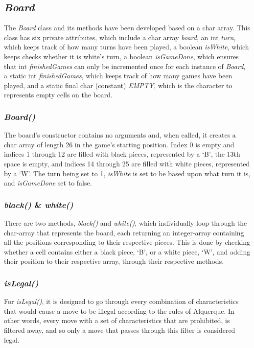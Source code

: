 \documentclass[12pt, a4paper]{article}
\begin{document}
\subsection{\emph{Board}}
The \emph{Board} class and its methods have been developed based on a char array. This class has six private attributes, which include a char array \emph{board}, an int \emph{turn}, which keeps track of how many turns have been played, a boolean \emph{isWhite}, which keeps checks whether it is white’s turn, a boolean \emph{isGameDone}, which ensures that int \emph{finishedGames} can only be incremented once for each instance of \emph{Board}, a static int \emph{finishedGames}, which keeps track of how many games have been played, and a static final char (constant) \emph{EMPTY}, which is the character to represents empty cells on the board.

\subsubsection{\emph{Board()}}
The board's constructor contains no arguments and, when called, it creates a char array of length 26 in the game's starting position. Index 0 is empty and indices 1 through 12 are filled with black pieces, represented by a ‘B’, the 13th space is empty, and indices 14 through 25 are filled with white pieces, represented by a ‘W’. The turn being set to 1, \emph{isWhite} is set to be based upon what turn it is, and \emph{isGameDone} set to false. 

\subsubsection{\emph{black()} \& \emph{white()}}
There are two methods, \emph{black()} and \emph{white()}, which individually loop through the char-array that represents the board, each returning an integer-array containing all the positions corresponding to their respective pieces. This is done by checking whether a cell contains either a black piece, ‘B’, or a white piece, ‘W’, and adding their position to their respective array, through their respective methods.

\subsubsection{\emph{isLegal()}}
For \emph{isLegal()}, it is designed to go through every combination of characteristics that would cause a move to be illegal according to the rules of Alquerque. In other words, every move with a set of characteristics that are prohibited, is filtered away, and so only a move that passes through this filter is considered legal.
\end{document}
